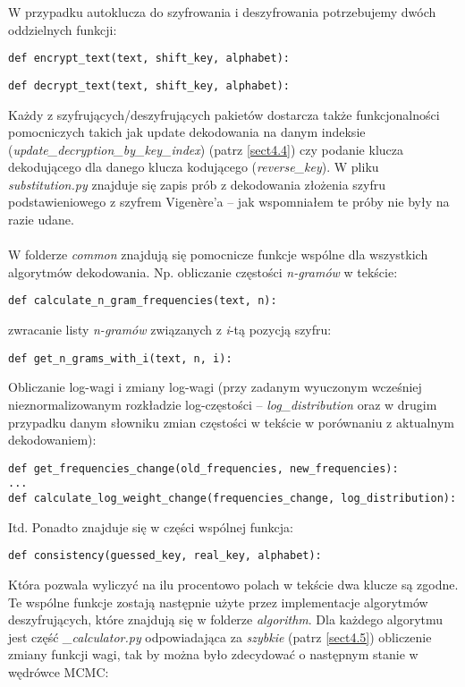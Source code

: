\documentclass[a4paper]{article}
\theoremstyle{defn}
\theoremstyle{theorem}
\theoremstyle{lemma}
\theoremstyle{cor}
\theoremstyle{fact}
\begin{document}
W przypadku autoklucza do szyfrowania i deszyfrowania potrzebujemy dwóch oddzielnych funkcji:
\begin{lstlisting}
def encrypt_text(text, shift_key, alphabet):
\end{lstlisting}
\begin{lstlisting}
def decrypt_text(text, shift_key, alphabet):
\end{lstlisting}
Każdy z szyfrujących/deszyfrujących pakietów dostarcza także funkcjonalności pomocniczych takich jak update dekodowania na danym indeksie (\textit{update\_decryption\_by\_key\_index}) (patrz \ref{sect4.4}) czy podanie klucza dekodującego dla danego klucza kodującego (\textit{reverse\_key}). W pliku \textit{substitution.py} znajduje się zapis prób z dekodowania złożenia szyfru podstawieniowego z szyfrem Vigenère'a – jak wspomniałem te próby nie były na razie udane.\\\\
W folderze \textit{common} znajdują się pomocnicze funkcje wspólne dla wszystkich algorytmów dekodowania. Np. obliczanie częstości \textit{n-gramów} w tekście:
\begin{lstlisting}
def calculate_n_gram_frequencies(text, n):
\end{lstlisting}
zwracanie listy \textit{n-gramów} związanych z \textit{i}-tą pozycją szyfru:
\begin{lstlisting}
def get_n_grams_with_i(text, n, i):
\end{lstlisting}
Obliczanie log-wagi i zmiany log-wagi (przy zadanym wyuczonym wcześniej nieznormalizowanym rozkładzie log-częstości – \textit{log\_distribution} oraz w drugim przypadku danym słowniku zmian częstości w tekście w porównaniu z aktualnym dekodowaniem):
\begin{lstlisting}
def get_frequencies_change(old_frequencies, new_frequencies):
...
def calculate_log_weight_change(frequencies_change, log_distribution):
\end{lstlisting}
Itd. Ponadto znajduje się w części wspólnej funkcja:
\begin{lstlisting}
def consistency(guessed_key, real_key, alphabet):
\end{lstlisting}
Która pozwala wyliczyć na ilu procentowo polach w tekście dwa klucze są zgodne.\\
Te wspólne funkcje zostają następnie użyte przez implementacje algorytmów deszyfrujących, które znajdują się w folderze \textit{algorithm}. Dla każdego algorytmu jest część \textit{\_calculator.py} odpowiadająca za \textit{szybkie} (patrz \ref{sect4.5}) obliczenie zmiany funkcji wagi, tak by można było zdecydować o następnym stanie w wędrówce MCMC:
\end{document}
